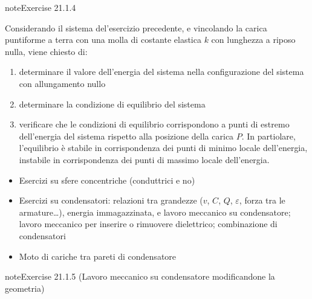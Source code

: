 \documentclass[letterpaper,10pt,italian]{jupyterBook}
\begin{document}
\begin{sphinxadmonition}{note}{Exercise 21.1.4}



\sphinxAtStartPar
Considerando il sistema del’esercizio precedente, e vincolando la carica puntiforme a terra con una molla di costante elastica \(k\) con lunghezza a riposo nulla, viene chiesto di:
\begin{enumerate}
%
\item {} 
\sphinxAtStartPar
determinare il valore dell’energia del sistema nella configurazione del sistema con allungamento nullo

\item {} 
\sphinxAtStartPar
determinare la condizione di equilibrio del sistema

\item {} 
\sphinxAtStartPar
verificare che le condizioni di equilibrio corrispondono a punti di estremo dell’energia del sistema rispetto alla posizione della carica \(P\). In partiolare, l’equilibrio è stabile in corrispondenza dei punti di minimo locale dell’energia, instabile in corrispondenza dei punti di massimo locale dell’energia.

\end{enumerate}
\end{sphinxadmonition}
\begin{itemize}
\item {} 
\sphinxAtStartPar
Esercizi su sfere concentriche (conduttrici e no)

\item {} 
\sphinxAtStartPar
Esercizi su condensatori: relazioni tra grandezze (\(v\), \(C\), \(Q\), \(\varepsilon\), forza tra le armature…), energia immagazzinata, e lavoro meccanico su condensatore; lavoro meccanico per inserire o rimuovere dielettrico; combinazione di condensatori

\item {} 
\sphinxAtStartPar
Moto di cariche tra pareti di condensatore

\end{itemize}
 \label{exercise:ch/electromagnetism/electrostatics-problems-exercise-4}

\begin{sphinxadmonition}{note}{Exercise 21.1.5 (Lavoro meccanico su condensatore modificandone la geometria)}


\end{sphinxadmonition}
 \label{exercise:ch/electromagnetism/electrostatics-problems-exercise-5}
\end{document}
